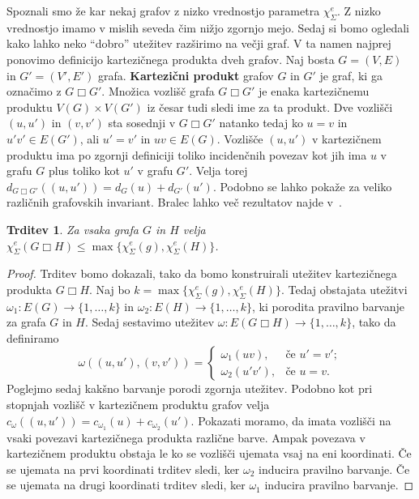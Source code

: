 \documentclass[12pt,a4paper,twoside]{article}
\theoremstyle{definition} %
\theoremstyle{plain} %
\newtheorem{trditev}[definicija]{Trditev}
\newcommand{\ec}{\chi_{\Sigma}^e}
\numberwithin{equation}{section}  %
\DeclareMathOperator{\cart}{\Box}
\begin{document}
Spoznali smo že kar nekaj grafov z nizko vrednostjo parametra $\ec$. Z nizko vrednostjo imamo v mislih seveda čim nižjo zgornjo mejo. Sedaj si bomo ogledali kako lahko neko ``dobro'' utežitev razširimo na večji graf. V ta namen najprej ponovimo definicijo kartezičnega produkta dveh grafov. Naj bosta $G =(V, E)$ in $G' = (V', E')$ grafa.  \textbf{Kartezični produkt} grafov $G$ in $G'$ je graf, ki ga označimo z $G \cart G'$. Množica vozlišč grafa  $G \cart G'$ je enaka kartezičnemu produktu $V(G) \times V(G')$ iz česar tudi sledi ime za ta produkt. Dve vozlišči $(u, u')$ in $(v, v')$ sta sosednji v $G  \cart G'$ natanko tedaj ko $u=v$ in $u'v' \in E(G')$, ali $u' = v'$ in $uv \in E(G)$. Vozlišče $(u, u')$ v kartezičnem produktu ima po zgornji definiciji toliko incidenčnih povezav kot jih ima $u$ v grafu $G$ plus toliko kot $u'$ v grafu $G'$. Velja torej $d_{G  \cart G'}((u, u')) = d_G(u) + d_{G'}(u')$. Podobno se lahko pokaže za veliko različnih grafovskih invariant. Bralec lahko več rezultatov najde v~\cite{klavzar}.
\begin{trditev}
Za vsaka grafa $G$ in $H$ velja $\ec(G \cart H) \le \max \{\ec(g), \ec(H)\}$.
\end{trditev}
\begin{proof}
Trditev bomo dokazali, tako da bomo konstruirali utežitev kartezičnega produkta  $G \cart H$. Naj bo $k =\max \{\ec(g), \ec(H)\} $. Tedaj obstajata utežitvi $\omega_1 : E(G) \rightarrow \{1, \ldots, k\}$ in $\omega_2 : E(H)\rightarrow \{1, \ldots, k\}$, ki porodita pravilno barvanje za grafa $G$ in $H$. Sedaj sestavimo utežitev $\omega : E(G \cart H) \rightarrow \{1, \ldots, k\}$, tako da definiramo 
\begin{equation*}
\omega((u, u'), (v, v')) = \begin{cases}
	\omega_1(uv) ,& \text{če } u' = v';\\ 
	\omega_2(u'v'), &\text{če } u = v.
	\end{cases}
\end{equation*}
Poglejmo sedaj kakšno barvanje porodi zgornja utežitev. Podobno kot pri stopnjah vozlišč v kartezičnem produktu grafov velja $c_{\omega}((u, u')) = c_{\omega_1}(u) + c_{\omega_2}(u')$. Pokazati moramo, da imata vozlišči na vsaki povezavi kartezičnega produkta različne barve. Ampak povezava v kartezičnem produktu obstaja le ko se vozlišči ujemata vsaj na eni koordinati. Če se ujemata na prvi koordinati trditev sledi, ker $\omega_2$ inducira pravilno barvanje. Če se ujemata na drugi koordinati trditev sledi, ker $\omega_1$ inducira pravilno barvanje.
\end{proof}
\end{document}
